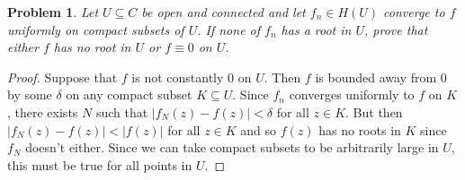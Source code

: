 \documentclass{article}
\newtheorem{problem}{Problem}
\begin{document}
\begin{problem}
Let $U \subseteq C$ be open and connected and let $f_n \in H(U)$ converge to $f$ uniformly on compact subsets of $U$. If none of $f_n$ has a root in $U$, prove that either $f$ has no root in $U$ or $f \equiv 0$ on $U$.
\end{problem}
\begin{proof}
Suppose that $f$ is not constantly $0$ on $U$. Then $f$ is bounded away from $0$ by some $\delta$ on any compact subset $K \subseteq U$. Since $f_n$ converges uniformly to $f$ on $K$, there exists $N$ such that $|f_N(z) - f(z)| < \delta$ for all $z \in K$. But then $|f_N(z) - f(z)| < |f(z)|$ for all $z \in K$ and so $f(z)$ has no roots in $K$ since $f_N$ doesn't either. Since we can take compact subsets to be arbitrarily large in $U$, this must be true for all points in $U$.
\end{proof}
\end{document}
